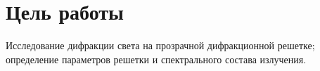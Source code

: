 \section{Цель работы}
Исследование дифракции света на прозрачной дифракционной решетке; определение параметров решетки и спектрального состава излучения.
